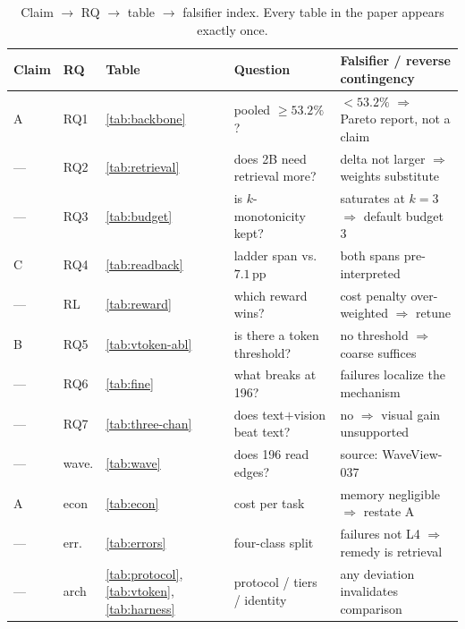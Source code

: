 \begin{table}[!t]
\centering
\caption{Claim $\to$ RQ $\to$ table $\to$ falsifier index. Every table in the paper appears exactly once.}
\label{tab:index}
\scriptsize
\renewcommand{\arraystretch}{0.82}
\setlength{\tabcolsep}{3pt}
\begin{tabular}{@{}llllp{6.3cm}@{}}
\toprule
\textbf{Claim} & \textbf{RQ} & \textbf{Table} & \textbf{Question} & \textbf{Falsifier / reverse contingency} \\
\midrule
A & RQ1 & \ref{tab:backbone} & pooled $\ge 53.2\%$? & $<53.2\%$ $\Rightarrow$ Pareto report, not a claim \\
--- & RQ2 & \ref{tab:retrieval} & does 2B need retrieval more? & delta not larger $\Rightarrow$ weights substitute \\
--- & RQ3 & \ref{tab:budget} & is $k$-monotonicity kept? & saturates at $k{=}3$ $\Rightarrow$ default budget 3 \\
C & RQ4 & \ref{tab:readback} & ladder span vs.\ $7.1$\,pp & both spans pre-interpreted \\
--- & RL & \ref{tab:reward} & which reward wins? & cost penalty over-weighted $\Rightarrow$ retune \\
B & RQ5 & \ref{tab:vtoken-abl} & is there a token threshold? & no threshold $\Rightarrow$ coarse suffices \\
--- & RQ6 & \ref{tab:fine} & what breaks at 196? & failures localize the mechanism \\
--- & RQ7 & \ref{tab:three-chan} & does text$+$vision beat text? & no $\Rightarrow$ visual gain unsupported \\
--- & wave. & \ref{tab:wave} & does 196 read edges? & source: WaveView-037 \\
A & econ & \ref{tab:econ} & cost per task & memory negligible $\Rightarrow$ restate A \\
--- & err. & \ref{tab:errors} & four-class split & failures not L4 $\Rightarrow$ remedy is retrieval \\
--- & arch & \ref{tab:protocol}, \ref{tab:vtoken}, \ref{tab:harness} & protocol / tiers / identity & any deviation invalidates comparison \\
\bottomrule
\end{tabular}
\end{table}

